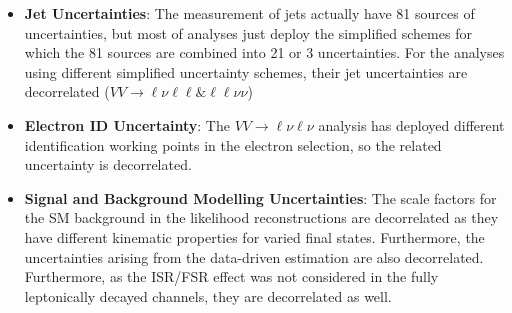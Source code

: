 \begin{itemize}
	\item[] {\bf Jet Uncertainties}: The measurement of jets actually have 81 sources of uncertainties, but most of analyses just deploy the simplified schemes for which the 81 sources are combined into 21 or 3 uncertainties. For the analyses using different simplified uncertainty schemes, their jet uncertainties are decorrelated ($VV\to\ell\nu\ell\ell\&\ell\ell\nu\nu$)
	\item[] {\bf Electron ID Uncertainty}: The  $VV\to\ell\nu\ell\nu$ analysis has deployed different identification working points in the electron selection, so the related uncertainty is decorrelated. 
	\item[] {\bf Signal and Background Modelling Uncertainties}: The scale factors for the SM background in the likelihood reconstructions are decorrelated as they have different kinematic properties for varied final states. Furthermore, the uncertainties arising from the data-driven estimation are also decorrelated. Furthermore, as the ISR/FSR effect was not considered in the fully leptonically decayed channels, they are decorrelated as well.  
\end{itemize}
